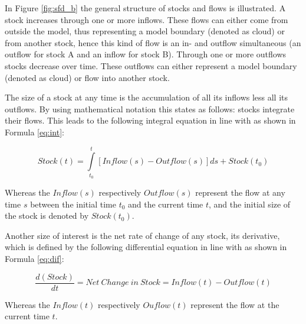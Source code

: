 In Figure \ref{fig:sfd_b} the general structure of stocks and flows is illustrated. A stock increases through one or more inflows. These flows can either come from outside the model, thus representing a model boundary (denoted as cloud) or from another stock, hence this kind of flow is an in- and outflow simultaneous (an outflow for stock A and an inflow for stock B). Through one or more outflows stocks decrease over time. These outflows can either represent a model boundary (denoted as cloud) or flow into another stock.

The size of a stock at any time is the accumulation of all its inflows less all its outflows. By using mathematical notation this states as follows: stocks integrate their flows. This leads to the following integral equation in line with \citet[p. 194]{Sterman2000} as shown in  Formula \ref{eq:int}:

\begin{equation}\label{eq:int}
		Stock(t) = \int\limits_{t_0}^t [Inflow(s) - Outflow(s)]ds + Stock(t_0)
\end{equation}

Whereas the $Inflow(s)$ respectively $Outflow(s)$ represent the flow at any time $s$ between the initial time $t_0$ and the current time $t$, and the initial size of the stock is denoted by $Stock(t_0)$. 

Another size of interest is the net rate of change of any stock, its derivative, which is defined by the following differential equation in line with \citet[p. 194]{Sterman2000} as shown in Formula \ref{eq:dif}:

\begin{equation}\label{eq:dif}
		\frac{d(Stock)}{dt} = \mathit{Net~Change~in~Stock} = Inflow(t) - Outflow(t)
\end{equation}

Whereas the $Inflow(t)$ respectively $Ouflow(t)$ represent the flow at the current time $t$.

